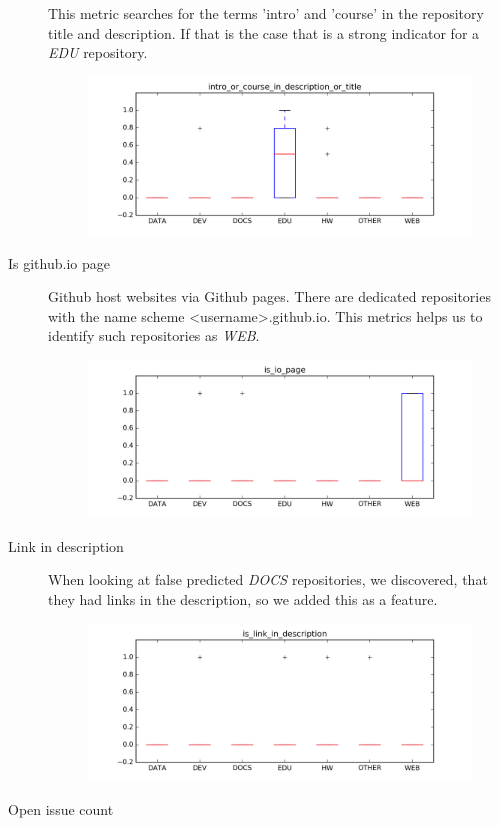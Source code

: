 \documentclass[a4paper]{scrartcl}
\begin{document}
\begin{description}
				This metric searches for the terms 'intro' and 'course' in the repository title and description. If that is the case that is a strong indicator for a \emph{EDU} repository.
				\begin{figure}[h!]
					\centering
					\includegraphics[width=0.75\linewidth]{figures/intro_or_course_in_description_or_title.png}
				\end{figure}
			\item[Is github.io page]
				Github host websites via Github pages. There are dedicated repositories with the name scheme <username>.github.io. This metrics helps us to identify such repositories as \emph{WEB}.
				\begin{figure}[h!]
					\centering
					\includegraphics[width=0.75\linewidth]{figures/is_io_page.png}
				\end{figure}
			\item[Link in description]
				When looking at false predicted \emph{DOCS} repositories, we discovered, that they had links in the description, so we added this as a feature.
				\begin{figure}[h!]
					\centering
					\includegraphics[width=0.75\linewidth]{figures/is_link_in_description.png}
				\end{figure}
			\item[Open issue count]

\end{description}
\end{document}
